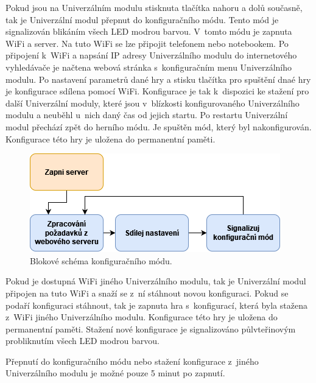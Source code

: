 Pokud jsou na Univerzálním modulu stisknuta tlačítka nahoru a dolů současně, tak je Univerzální modul přepnut do konfiguračního módu. Tento mód je signalizován blikáním všech LED modrou barvou. V~tomto módu je zapnuta WiFi a server. Na 
tuto WiFi se lze připojit telefonem nebo notebookem. Po připojení k~WiFi a napsání IP adresy Univerzálního modulu do internetového vyhledávače je načtena webová stránka s~konfiguračním menu Univerzálního modulu. Po nastavení parametrů 
dané hry a stisku 
tlačítka pro spuštění dnaé hry je konfigurace sdílena pomocí WiFi. Konfigurace je tak k~dispozici ke stažení pro další Univerzální moduly, které jsou v~blízkosti konfigurovaného Univerzálního modulu a neuběhl u~nich daný čas od jejich 
startu. Po restartu Univerzální modul přechází zpět do herního módu. Je spuštěn mód, který byl nakonfigurován. Konfigurace této hry je uložena do permanentní paměti.

\begin{figure}[!h]
  \begin{center}
    \includegraphics[scale=0.8]{obrazky/blokove_schema_modu_CONFIGURATION.png}
  \end{center}
  \caption[Blokové schéma konfiguračního módu]{Blokové schéma konfiguračního módu.}
\end{figure}

Pokud je dostupná WiFi jiného Univerzálního modulu, tak je Univerzální modul připojen na tuto WiFi a snaží se z~ní stáhnout novou konfiguraci. Pokud se podaří konfiguraci stáhnout, tak je zapnuta hra s~konfigurací,
která byla stažena z~WiFi jiného Univerzálního modulu. Konfigurace této hry je uložena do permanentní paměti. Stažení nové konfigurace je signalizováno půlvteřinovým probliknutím všech LED modrou barvou. 

Přepnutí do konfiguračního módu nebo stažení konfigurace z~jiného Univerzálního modulu je možné pouze 5 minut po zapnutí. 

